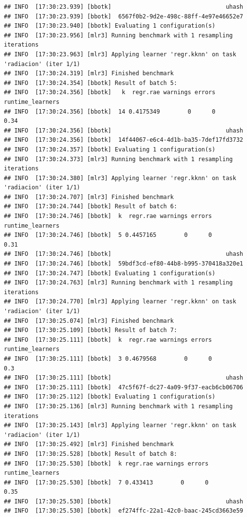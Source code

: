 \documentclass[
  11pt,
  a4paper,
]{article}
\begin{document}
\begin{verbatim}
## INFO  [17:30:23.939] [bbotk]                                 uhash
## INFO  [17:30:23.939] [bbotk]  6567f0b2-9d2e-498c-88ff-4e97e46652e7
## INFO  [17:30:23.940] [bbotk] Evaluating 1 configuration(s)
## INFO  [17:30:23.956] [mlr3] Running benchmark with 1 resampling iterations
## INFO  [17:30:23.963] [mlr3] Applying learner 'regr.kknn' on task 'radiacion' (iter 1/1)
## INFO  [17:30:24.319] [mlr3] Finished benchmark
## INFO  [17:30:24.354] [bbotk] Result of batch 5:
## INFO  [17:30:24.356] [bbotk]   k  regr.rae warnings errors runtime_learners
## INFO  [17:30:24.356] [bbotk]  14 0.4175349        0      0             0.34
## INFO  [17:30:24.356] [bbotk]                                 uhash
## INFO  [17:30:24.356] [bbotk]  14f44067-e6c4-4d1b-ba35-7def17fd3732
## INFO  [17:30:24.357] [bbotk] Evaluating 1 configuration(s)
## INFO  [17:30:24.373] [mlr3] Running benchmark with 1 resampling iterations
## INFO  [17:30:24.380] [mlr3] Applying learner 'regr.kknn' on task 'radiacion' (iter 1/1)
## INFO  [17:30:24.707] [mlr3] Finished benchmark
## INFO  [17:30:24.744] [bbotk] Result of batch 6:
## INFO  [17:30:24.746] [bbotk]  k  regr.rae warnings errors runtime_learners
## INFO  [17:30:24.746] [bbotk]  5 0.4457165        0      0             0.31
## INFO  [17:30:24.746] [bbotk]                                 uhash
## INFO  [17:30:24.746] [bbotk]  59bdf3cd-ef80-44b8-b995-370418a320e1
## INFO  [17:30:24.747] [bbotk] Evaluating 1 configuration(s)
## INFO  [17:30:24.763] [mlr3] Running benchmark with 1 resampling iterations
## INFO  [17:30:24.770] [mlr3] Applying learner 'regr.kknn' on task 'radiacion' (iter 1/1)
## INFO  [17:30:25.074] [mlr3] Finished benchmark
## INFO  [17:30:25.109] [bbotk] Result of batch 7:
## INFO  [17:30:25.111] [bbotk]  k  regr.rae warnings errors runtime_learners
## INFO  [17:30:25.111] [bbotk]  3 0.4679568        0      0              0.3
## INFO  [17:30:25.111] [bbotk]                                 uhash
## INFO  [17:30:25.111] [bbotk]  47c5f67f-dc27-4a09-9f37-eacb6cb06706
## INFO  [17:30:25.112] [bbotk] Evaluating 1 configuration(s)
## INFO  [17:30:25.136] [mlr3] Running benchmark with 1 resampling iterations
## INFO  [17:30:25.143] [mlr3] Applying learner 'regr.kknn' on task 'radiacion' (iter 1/1)
## INFO  [17:30:25.492] [mlr3] Finished benchmark
## INFO  [17:30:25.528] [bbotk] Result of batch 8:
## INFO  [17:30:25.530] [bbotk]  k regr.rae warnings errors runtime_learners
## INFO  [17:30:25.530] [bbotk]  7 0.433413        0      0             0.35
## INFO  [17:30:25.530] [bbotk]                                 uhash
## INFO  [17:30:25.530] [bbotk]  ef274ffc-22a1-42c0-baac-245cd3663e59

\end{verbatim}
\end{document}
